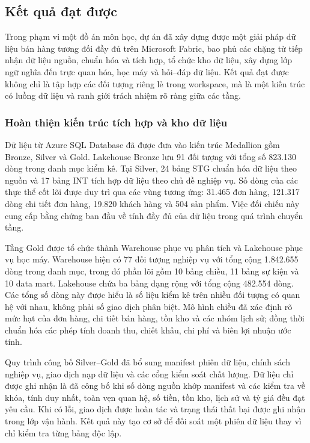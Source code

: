 
\setcounter{section}{5}

\subsection{Kết quả đạt được}

Trong phạm vi một đồ án môn học, dự án đã xây dựng được một giải pháp dữ liệu bán hàng tương đối đầy đủ trên Microsoft Fabric, bao phủ các chặng từ tiếp nhận dữ liệu nguồn, chuẩn hóa và tích hợp, tổ chức kho dữ liệu, xây dựng lớp ngữ nghĩa đến trực quan hóa, học máy và hỏi--đáp dữ liệu. Kết quả đạt được không chỉ là tập hợp các đối tượng riêng lẻ trong workspace, mà là một kiến trúc có luồng dữ liệu và ranh giới trách nhiệm rõ ràng giữa các tầng.

\subsubsection{Hoàn thiện kiến trúc tích hợp và kho dữ liệu}

Dữ liệu từ Azure SQL Database đã được đưa vào kiến trúc Medallion gồm Bronze, Silver và Gold. Lakehouse Bronze lưu 91 đối tượng với tổng số 823.130 dòng trong danh mục kiểm kê. Tại Silver, 24 bảng STG chuẩn hóa dữ liệu theo nguồn và 17 bảng INT tích hợp dữ liệu theo chủ đề nghiệp vụ. Số dòng của các thực thể cốt lõi được duy trì qua các vùng tương ứng: 31.465 đơn hàng, 121.317 dòng chi tiết đơn hàng, 19.820 khách hàng và 504 sản phẩm. Việc đối chiếu này cung cấp bằng chứng ban đầu về tính đầy đủ của dữ liệu trong quá trình chuyển tầng.

Tầng Gold được tổ chức thành Warehouse phục vụ phân tích và Lakehouse phục vụ học máy. Warehouse  hiện có 77 đối tượng nghiệp vụ với tổng cộng 1.842.655 dòng trong danh mục, trong đó phần lõi gồm 10 bảng chiều, 11 bảng sự kiện và 10 data mart. Lakehouse  chứa ba bảng dạng rộng với tổng cộng 482.554 dòng. Các tổng số dòng này được hiểu là số liệu kiểm kê trên nhiều đối tượng có quan hệ với nhau, không phải số giao dịch phân biệt. Mô hình chiều đã xác định rõ mức hạt của đơn hàng, chi tiết bán hàng, tồn kho và các nhóm lịch sử; đồng thời chuẩn hóa các phép tính doanh thu, chiết khấu, chi phí và biên lợi nhuận ước tính.

Quy trình công bố Silver--Gold đã bổ sung manifest phiên dữ liệu, chính sách nghiệp vụ, giao dịch nạp dữ liệu và các cổng kiểm soát chất lượng. Dữ liệu chỉ được ghi nhận là đã công bố khi số dòng nguồn khớp manifest và các kiểm tra về khóa, tính duy nhất, toàn vẹn quan hệ, số tiền, tồn kho, lịch sử và tỷ giá đều đạt yêu cầu. Khi có lỗi, giao dịch được hoàn tác và trạng thái thất bại được ghi nhận trong lớp vận hành. Kết quả này tạo cơ sở để đối soát một phiên dữ liệu thay vì chỉ kiểm tra từng bảng độc lập.

